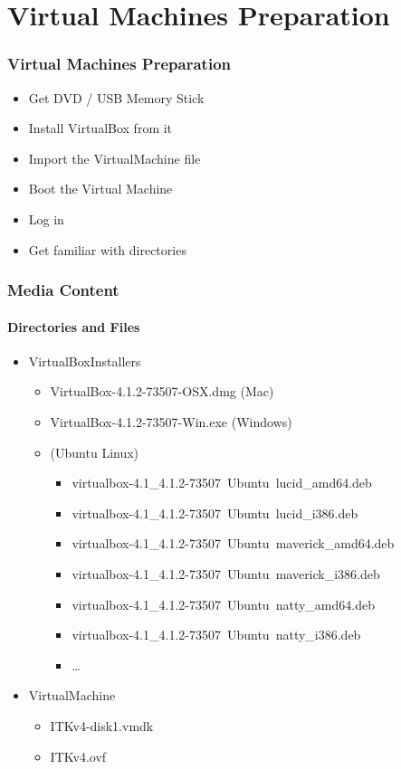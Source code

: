 \section{Virtual Machines Preparation}


\begin{frame}
\frametitle{Virtual Machines Preparation}
\begin{itemize}
\item Get DVD / USB Memory Stick
\item Install VirtualBox from it
\item Import the VirtualMachine file
\item Boot the Virtual Machine
\item Log in
\item Get familiar with directories
\end{itemize}
\end{frame}


\begin{frame}
\frametitle{Media Content}
\framesubtitle{Directories and Files}
\begin{itemize}
\item VirtualBoxInstallers
\begin{itemize}
\item VirtualBox-4.1.2-73507-OSX.dmg (Mac)
\item VirtualBox-4.1.2-73507-Win.exe (Windows)
\item (Ubuntu Linux)
\begin{itemize}
\item virtualbox-4.1\_4.1.2-73507~Ubuntu~lucid\_amd64.deb
\item virtualbox-4.1\_4.1.2-73507~Ubuntu~lucid\_i386.deb
\item virtualbox-4.1\_4.1.2-73507~Ubuntu~maverick\_amd64.deb
\item virtualbox-4.1\_4.1.2-73507~Ubuntu~maverick\_i386.deb
\item virtualbox-4.1\_4.1.2-73507~Ubuntu~natty\_amd64.deb
\item virtualbox-4.1\_4.1.2-73507~Ubuntu~natty\_i386.deb
\item \ldots
\end{itemize}
\end{itemize}
\pause
\item VirtualMachine
\begin{itemize}
\item  ITKv4-disk1.vmdk
\item  ITKv4.ovf
\end{itemize}
\end{itemize}
\end{frame}

